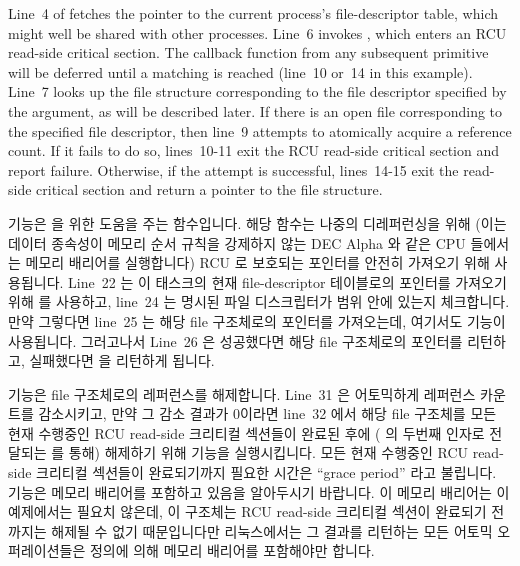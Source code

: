 Line~4 of  fetches the pointer to the current
process's file-descriptor table, which might well be shared
with other processes.
Line~6 invokes , which
enters an RCU read-side critical section.
The callback function from any subsequent  primitive
will be deferred until a matching  is reached
(line~10 or~14 in this example).
Line~7 looks up the file structure corresponding to the file
descriptor specified by the  argument, as will be
described later.
If there is an open file corresponding to the specified file descriptor,
then line~9 attempts to atomically acquire a reference count.
If it fails to do so, lines~10-11 exit the RCU read-side critical
section and report failure.
Otherwise, if the attempt is successful, lines~14-15 exit the read-side
critical section and return a pointer to the file structure.
\fi

 기능은  을 위한 도움을 주는 함수입니다.
해당 함수는 나중의 디레퍼런싱을 위해 (이는 데이터 종속성이 메모리 순서 규칙을
강제하지 않는 DEC Alpha 와 같은 CPU 들에서는 메모리 배리어를 실행합니다)
RCU 로 보호되는 포인터를 안전히 가져오기 위해 사용됩니다.
Line~22 는 이 태스크의 현재 file-descriptor 테이블로의 포인터를 가져오기 위해
 를 사용하고, line~24 는 명시된 파일 디스크립터가 범위
안에 있는지 체크합니다.
만약 그렇다면 line~25 는 해당 file 구조체로의 포인터를 가져오는데, 여기서도
 기능이 사용됩니다.
그러고나서 Line~26 은 성공했다면 해당 file 구조체로의 포인터를 리턴하고,
실패했다면  을 리턴하게 됩니다.
\iffalse

The \co{fcheck_files()} primitive is a helper function for
\co{fget()}.
It uses the \co{rcu_dereference()} primitive to safely fetch an
RCU-protected pointer for later dereferencing (this emits a
memory barrier on CPUs such as DEC Alpha in which data dependencies
do not enforce memory ordering).
Line~22 uses \co{rcu_dereference()} to fetch a pointer to this
task's current file-descriptor table,
and line~24 checks to see if the specified file descriptor is in range.
If so, line~25 fetches the pointer to the file structure, again using
the \co{rcu_dereference()} primitive.
Line~26 then returns a pointer to the file structure or \co{NULL}
in case of failure.
\fi

 기능은 file 구조체로의 레퍼런스를 해제합니다.
Line~31 은 어토믹하게 레퍼런스 카운트를 감소시키고, 만약 그 감소 결과가 0이라면
line~32 에서 해당 file 구조체를 모든 현재 수행중인 RCU read-side 크리티컬
섹션들이 완료된 후에 ( 의 두번째 인자로 전달되는
 를 통해) 해제하기 위해  기능을
실행시킵니다.
모든 현재 수행중인 RCU read-side 크리티컬 섹션들이 완료되기까지 필요한 시간은
``grace period'' 라고 불립니다.
 기능은 메모리 배리어를 포함하고 있음을 알아두시기
바랍니다.
이 메모리 배리어는 이 예제에서는 필요치 않은데, 이 구조체는 RCU read-side
크리티컬 섹션이 완료되기 전까지는 해제될 수 없기 때문입니다만 리눅스에서는 그
결과를 리턴하는 모든 어토믹 오퍼레이션들은 정의에 의해 메모리 배리어를
포함해야만 합니다.
\iffalse

